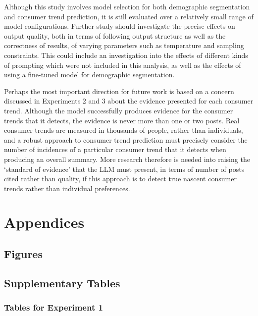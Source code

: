\documentclass{report}
\begin{document}
Although this study involves model selection for both demographic segmentation and consumer trend prediction, it is still evaluated over a relatively small range of model configurations. Further study should investigate the precise effects on output quality, both in terms of following output structure as well as the correctness of results, of varying parameters such as temperature and sampling constraints. This could include an investigation into the effects of different kinds of prompting which were not included in this analysis, as well as the effects of using a fine-tuned model for demographic segmentation.

Perhaps the most important direction for future work is based on a concern discussed in Experiments 2 and 3 about the evidence presented for each consumer trend. Although the model successfully produces evidence for the consumer trends that it detects, the evidence is never more than one or two posts. Real consumer trends are measured in thousands of people, rather than individuals, and a robust approach to consumer trend prediction must precisely consider the number of incidences of a particular consumer trend that it detects when producing an overall summary. More research therefore is needed into raising the `standard of evidence' that the LLM must present, in terms of number of posts cited rather than quality, if this approach is to detect true nascent consumer trends rather than individual preferences. 

\printbibliography


\cleardoublepage

\appendix
\chapter{Appendices}
\label{app:appendices}

\section{Figures}
\label{app:figures}

\section{Supplementary Tables}
\label{app:tables}

\subsection{Tables for Experiment 1}
\end{document}
